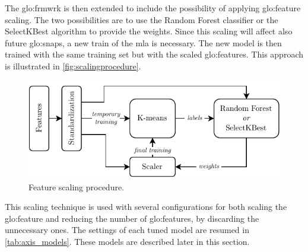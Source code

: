 The \gls{glo:frmwrk} is then extended to include the possibility of applying \gls{glo:feature} scaling. The two possibilities are to use the Random Forest classifier or the SelectKBest algorithm to provide the weights. Since this scaling will affect also future \gls{glo:snap}s, a new train of the \gls{mla} is necessary. The new model is then trained with the same training set but with the scaled \gls{glo:feature}s. This approach is illustrated in \autoref{fig:scalingprocedure}.

\begin{figure}[h!]
    \centering
    \includegraphics{images/LinearMotor/Feat_scaling.pdf}
    \caption{Feature scaling procedure.}
    \label{fig:scalingprocedure}
\end{figure}

This scaling technique is used with several configurations for both scaling the \gls{glo:feature} and reducing the number of \gls{glo:feature}s, by discarding the unnecessary ones. The settings of each tuned model are resumed in \autoref{tab:axis_models}. These models are described later in this section.

